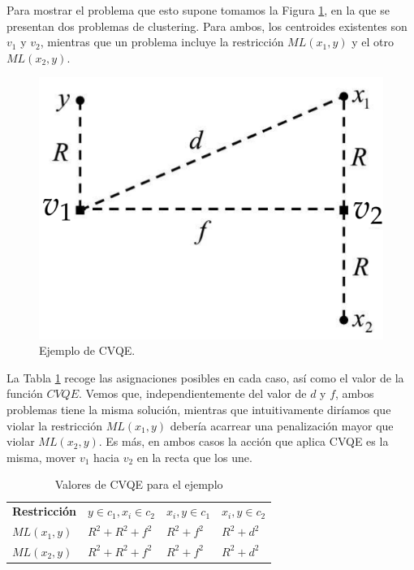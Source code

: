 Para mostrar el problema que esto supone tomamos la Figura \ref{fig:figure20}, en la que se presentan dos problemas de clustering. Para ambos, los centroides existentes son $v_1$ y $v_2$, mientras que un problema incluye la restricción $ML(x_1, y)$ y el otro $ML(x_2, y)$.


\begin{figure}[!h]
	\centering
	\includegraphics[scale=0.3]{imagenes/c4/Fig2}
	\caption[Ejemplo de CVQE.]{Ejemplo de CVQE. \cite{LCVQE:2007}}\label{fig:figure20}
\end{figure}

La Tabla \ref{tab:tabla3} recoge las asignaciones posibles en cada caso, así como el valor de la función $CVQE$. Vemos que, independientemente del valor de $d$ y $f$, ambos problemas tiene la misma solución, mientras que intuitivamente diríamos que violar la restricción $ML(x_1, y)$ debería acarrear una penalización mayor que violar $ML(x_2, y)$. Es más, en ambos casos la acción que aplica \acs{CVQE} es la misma, mover $v_1$ hacia $v_2$ en la recta que los une.

\begin{table}[!h]
	\centering
	\setlength{\arrayrulewidth}{1mm}
	\setlength{\tabcolsep}{10pt}
	\renewcommand{\arraystretch}{0.9}
	
	\begin{tabular}{ >{\centering\arraybackslash}m{2cm}  >{\centering\arraybackslash}m{2.5cm}>{\centering\arraybackslash}m{2cm}>{\centering\arraybackslash}m{2cm}}
		\hline
		\rowcolor{black}
		\multicolumn{4}{c}{\bf \color{white}{Valores de CVQE}}\\
		\hline
		\rowcolor{gray!50}
		\textbf{Restricción} & \textbf{$y \in c_1, x_i \in c_2$} & \textbf{$x_i,y \in c_1$} & \textbf{$x_i,y \in c_2$}  \\
		$ML(x_1, y)$ & $R^2 + R^2 + f^2$ & $R^2 + f^2 $ & $R^2 + d^2 $  \\
		$ML(x_2, y)$ & $R^2 + R^2 + f^2$ & $R^2 + f^2 $ & $R^2 + d^2 $  \\
		\hline
		
	\end{tabular}
	\caption[Valores de CVQE para el ejemplo]{Valores de CVQE para el ejemplo \cite{CECM:2012}}
	\label{tab:tabla3}
\end{table}

